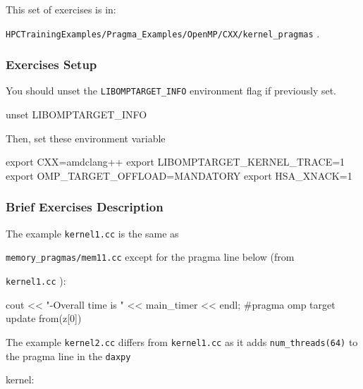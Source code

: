 \documentclass[
]{article}
\let\oldtexttt\texttt
\renewcommand{\texttt}[1]{
  \colorbox{Light}{\oldtexttt{#1}}
}
\newenvironment{Shaded}{}{}
\newcommand{\BuiltInTok}[1]{#1}
\newcommand{\ExtensionTok}[1]{#1}
\newcommand{\NormalTok}[1]{#1}
\newcommand{\OperatorTok}[1]{\textcolor[rgb]{0.40,0.40,0.40}{#1}}
\newcommand{\StringTok}[1]{\textcolor[rgb]{0.25,0.44,0.63}{#1}}
\newcommand{\VariableTok}[1]{\textcolor[rgb]{0.10,0.09,0.49}{#1}}
\begin{document}
This set of exercises is in:
\texttt{HPCTrainingExamples/Pragma\_Examples/OpenMP/CXX/kernel\_pragmas}.

\hypertarget{exercises-setup-1}{%
\subsubsection{Exercises Setup}\label{exercises-setup-1}}

You should unset the \texttt{LIBOMPTARGET\_INFO} environment flag if
previously set.

\begin{Shaded}
\begin{Highlighting}[]
\BuiltInTok{unset} \VariableTok{LIBOMPTARGET\_INFO}
\end{Highlighting}
\end{Shaded}

Then, set these environment variable

\begin{Shaded}
\begin{Highlighting}[]
\BuiltInTok{export} \VariableTok{CXX=}\NormalTok{amdclang++}
\BuiltInTok{export} \VariableTok{LIBOMPTARGET\_KERNEL\_TRACE=}\NormalTok{1}
\BuiltInTok{export} \VariableTok{OMP\_TARGET\_OFFLOAD=}\NormalTok{MANDATORY}
\BuiltInTok{export} \VariableTok{HSA\_XNACK=}\NormalTok{1}
\end{Highlighting}
\end{Shaded}

\hypertarget{brief-exercises-description}{%
\subsubsection{Brief Exercises
Description}\label{brief-exercises-description}}

The example \texttt{kernel1.cc} is the same as
\texttt{memory\_pragmas/mem11.cc} except for the pragma line below (from
\texttt{kernel1.cc}):

\begin{Shaded}
\begin{Highlighting}[]
\ExtensionTok{cout} \OperatorTok{\textless{}\textless{} "{-}Overall} \BuiltInTok{time}\NormalTok{ is }\StringTok{" \textless{}\textless{} main\_timer \textless{}\textless{} endl;}
\StringTok{\#pragma omp target update from(z[0])}
\end{Highlighting}
\end{Shaded}

The example \texttt{kernel2.cc} differs from \texttt{kernel1.cc} as it
adds \texttt{num\_threads(64)} to the pragma line in the \texttt{daxpy}
kernel:
\end{document}
